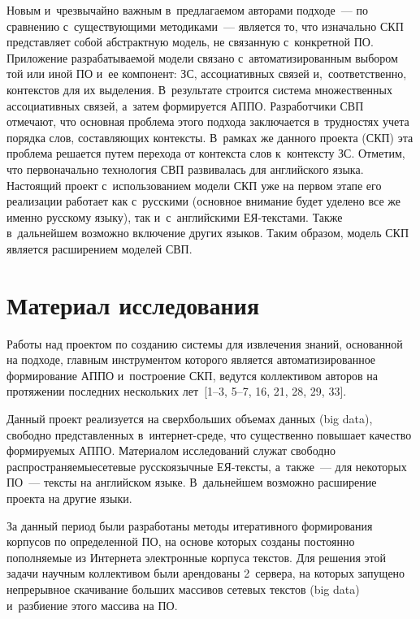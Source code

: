 \begin{multicols}{2}
     Новым и~чрезвычайно важным в~предлагаемом авторами подходе~---
по сравнению с~существу\-ющи\-ми методиками~--- является то, что изначально
СКП представляет собой абстрактную модель, не связанную с~конкретной
ПО. Приложение разрабатываемой модели связано с~автоматизированным выбором той или иной ПО и~ее
компонент: ЗС, ассоциативных связей и,~соответственно, контекстов для их выделения. В~результате строится
система множественных ассоциативных связей, а~затем формируется
АППО. Разработчики СВП
отмечают, что основная проблема этого подхода заключается в~трудностях
учета порядка слов, составляющих контексты. В~рамках же данного проекта
(СКП) эта проблема решается путем перехода от контекста слов к~контексту
ЗС. Отметим, что первоначально технология СВП
развивалась для английского языка. Настоящий проект с~использованием
модели СКП уже на первом этапе его реализации работает как с~русскими
(основное внимание будет уделено все же именно русскому языку), так
и~с~английскими ЕЯ-текс\-та\-ми. Также в~дальнейшем возможно
включение других языков. Таким образом, модель СКП является
расширением моделей СВП.

    \section{Материал исследования}

     Работы над проектом по созданию системы для извлечения знаний,
основанной на подходе, главным инструментом которого является
автоматизированное формирование АППО и~построение СКП, ведутся
коллективом авторов на протяжении последних
нескольких лет~[1--3, 5--7, 16, 21, 28, 29, 33].

     Данный проект реализуется на сверхбольших объемах данных (big
data), свободно представленных в~ин\-тер\-нет-сре\-де, что существенно
повышает качество формируемых АППО. Материалом исследований служат
свободно распространяемые\linebreak сетевые русскоязычные ЕЯ-текс\-ты, а~также~---
для некоторых ПО~--- тексты на английском языке.
В~дальней\-шем возможно расширение проекта на другие языки.

     За данный период были разработаны методы итеративного
формирования корпусов по определенной ПО, на основе
которых созданы постоянно пополняемые из Интернета электронные корпуса
текстов. Для решения этой задачи научным коллективом были арендованы
2~сервера, на которых запущено непрерывное скачивание больших массивов
сетевых текстов (big data) и~разбиение этого массива на ПО.




\end{multicols}

